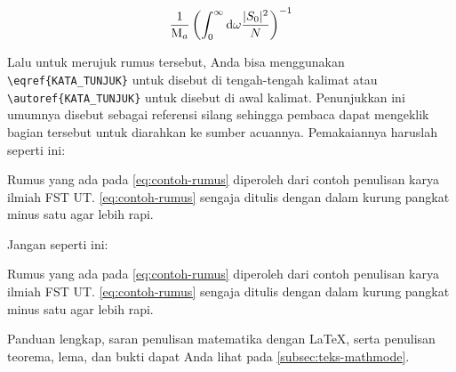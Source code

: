 \begin{equation}
    \frac{1}{\mathrm{M}_a} \left( \int_{0}^{\infty} \mathrm{d} \omega \frac{|S_0|^2}{N} \right)^{-1}
    \label{eq:contoh-rumus}
\end{equation}

Lalu untuk merujuk rumus tersebut, Anda bisa menggunakan \verb|\eqref{KATA_TUNJUK}| untuk disebut di tengah-tengah kalimat atau \verb|\autoref{KATA_TUNJUK}| untuk disebut di awal kalimat. Penunjukkan ini umumnya disebut sebagai referensi silang sehingga pembaca dapat mengeklik bagian tersebut untuk diarahkan ke sumber acuannya. Pemakaiannya haruslah seperti ini:

Rumus yang ada pada \eqref{eq:contoh-rumus} diperoleh dari contoh penulisan karya ilmiah FST UT. \autoref{eq:contoh-rumus} sengaja ditulis dengan dalam kurung pangkat minus satu agar lebih rapi.

Jangan seperti ini:

Rumus yang ada pada \autoref{eq:contoh-rumus} diperoleh dari contoh penulisan karya ilmiah FST UT. \eqref{eq:contoh-rumus} sengaja ditulis dengan dalam kurung pangkat minus satu agar lebih rapi.

Panduan lengkap, saran penulisan matematika dengan \LaTeX, serta penulisan teorema, lema, dan bukti dapat Anda lihat pada \autoref{subsec:teks-mathmode}.